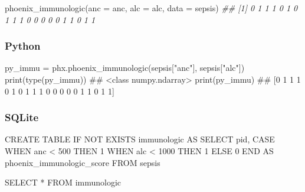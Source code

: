 \documentclass[
  letterpaper,
  DIV=11,
  numbers=noendperiod]{scrartcl}
\newenvironment{Shaded}{\begin{snugshade}}{\end{snugshade}}
\newcommand{\AttributeTok}[1]{\textcolor[rgb]{0.40,0.45,0.13}{#1}}
\newcommand{\BuiltInTok}[1]{\textcolor[rgb]{0.00,0.23,0.31}{#1}}
\newcommand{\CommentTok}[1]{\textcolor[rgb]{0.37,0.37,0.37}{#1}}
\newcommand{\ControlFlowTok}[1]{\textcolor[rgb]{0.00,0.23,0.31}{#1}}
\newcommand{\DecValTok}[1]{\textcolor[rgb]{0.68,0.00,0.00}{#1}}
\newcommand{\DocumentationTok}[1]{\textcolor[rgb]{0.37,0.37,0.37}{\textit{#1}}}
\newcommand{\FunctionTok}[1]{\textcolor[rgb]{0.28,0.35,0.67}{#1}}
\newcommand{\KeywordTok}[1]{\textcolor[rgb]{0.00,0.23,0.31}{#1}}
\newcommand{\NormalTok}[1]{\textcolor[rgb]{0.00,0.23,0.31}{#1}}
\newcommand{\OperatorTok}[1]{\textcolor[rgb]{0.37,0.37,0.37}{#1}}
\newcommand{\StringTok}[1]{\textcolor[rgb]{0.13,0.47,0.30}{#1}}
\begin{document}
\begin{Shaded}
\begin{Highlighting}[]
\FunctionTok{phoenix\_immunologic}\NormalTok{(}\AttributeTok{anc =}\NormalTok{ anc, }\AttributeTok{alc =}\NormalTok{ alc, }\AttributeTok{data =}\NormalTok{ sepsis)}
\DocumentationTok{\#\#  [1] 0 1 1 1 0 1 0 1 1 1 0 0 0 0 0 1 1 0 1 1}
\end{Highlighting}
\end{Shaded}

\subsubsection{Python}\label{python-7}

\begin{Shaded}
\begin{Highlighting}[]
\NormalTok{py\_immu }\OperatorTok{=}\NormalTok{ phx.phoenix\_immunologic(sepsis[}\StringTok{"anc"}\NormalTok{], sepsis[}\StringTok{"alc"}\NormalTok{])}
\BuiltInTok{print}\NormalTok{(}\BuiltInTok{type}\NormalTok{(py\_immu))}
\CommentTok{\#\# \textless{}class \textquotesingle{}numpy.ndarray\textquotesingle{}\textgreater{}}
\BuiltInTok{print}\NormalTok{(py\_immu)}
\CommentTok{\#\# [0 1 1 1 0 1 0 1 1 1 0 0 0 0 0 1 1 0 1 1]}
\end{Highlighting}
\end{Shaded}

\subsubsection{SQLite}\label{sqlite-5}

\begin{Shaded}
\begin{Highlighting}[]
\KeywordTok{CREATE} \KeywordTok{TABLE} \ControlFlowTok{IF} \KeywordTok{NOT} \KeywordTok{EXISTS}\NormalTok{ immunologic }\KeywordTok{AS}
\KeywordTok{SELECT}
\NormalTok{  pid,}
  \ControlFlowTok{CASE} \ControlFlowTok{WHEN}\NormalTok{ anc }\OperatorTok{\textless{}}  \DecValTok{500} \ControlFlowTok{THEN} \DecValTok{1}
       \ControlFlowTok{WHEN}\NormalTok{ alc }\OperatorTok{\textless{}} \DecValTok{1000} \ControlFlowTok{THEN} \DecValTok{1}
       \ControlFlowTok{ELSE} \DecValTok{0} \ControlFlowTok{END} \KeywordTok{AS}\NormalTok{ phoenix\_immunologic\_score}
\KeywordTok{FROM}\NormalTok{ sepsis}
\end{Highlighting}
\end{Shaded}

\begin{Shaded}
\begin{Highlighting}[]
\KeywordTok{SELECT} \OperatorTok{*} \KeywordTok{FROM}\NormalTok{ immunologic}
\end{Highlighting}
\end{Shaded}
\end{document}
